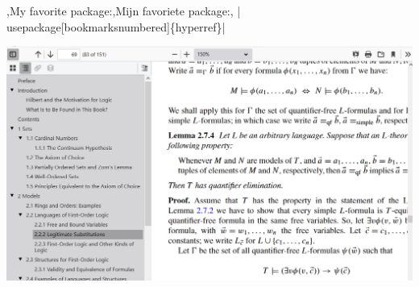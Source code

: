 
\begin{frame}{%
    \lang,My favorite package:,Mijn favoriete package:, \hll|\\usepackage[bookmarksnumbered]\{hyperref\}|}

\includegraphics[height=0.8\textheight,width=\linewidth,keepaspectratio]{assets/hyperref2.png}

\end{frame}

